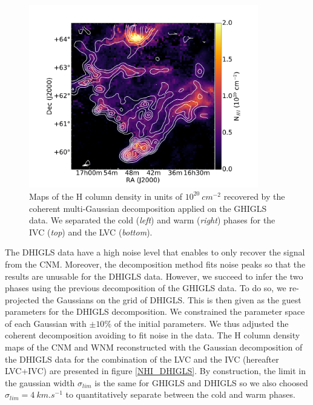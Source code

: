 \documentclass[traditabstract]{aa}
\begin{document}
\begin{figure}[h]
  \hspace{3mm}
  \includegraphics[page=5,height=8cm,trim=140 20 120 70,clip=true]{Figures/GHIGLS_NHI.pdf}
  \caption{\label{Phases_GHIGLS} Maps of the H column density in units of $10^{20}\: cm^{-2}$ recovered by the coherent multi-Gaussian decomposition applied on the GHIGLS data. We separated the cold (\emph{left}) and warm (\emph{right}) phases for the IVC (\emph{top}) and the LVC (\emph{bottom}).}
\end{figure}

   The DHIGLS data have a high noise level that enables to only recover the signal from the CNM. Moreover, the decomposition method fits noise peaks so that the results are unusable for the DHIGLS data. However, we succeed to infer the two phases using the previous decomposition of the GHIGLS data. To do so, we re-projected the Gaussians on the grid of DHIGLS. This is then given as the guest parameters for the DHIGLS decomposition. We constrained the parameter space of each Gaussian with $\pm 10\%$ of the initial parameters.
We thus adjusted the coherent decomposition avoiding to fit noise in the data. The H column density maps of the CNM and WNM reconstructed with the Gaussian decomposition of the DHIGLS data for the combination of the LVC and the IVC (hereafter LVC+IVC) are presented in figure \ref{NHI_DHIGLS}. By construction, the limit in the gaussian width $\sigma_{lim}$ is the same for GHIGLS and DHIGLS so we also choosed $\sigma_{lim}=4\: km.s^{-1}$ to quantitatively separate between the cold and warm phases.
\end{document}
